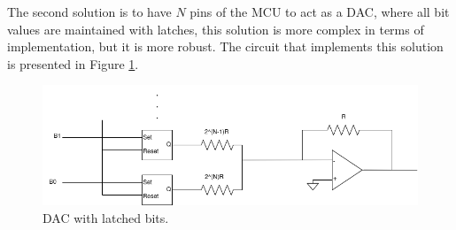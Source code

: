 The second solution is to have $N$ pins of the MCU to act as a DAC, where all bit values are maintained with latches, this solution is more complex in terms of implementation, but it is more robust. The circuit that implements this solution is presented in Figure \ref{fig:LatchDAC}.

\begin{figure}[H]
    \centering
    \includegraphics*[scale = 0.5]{Images/LatchCirc.png}
    \caption{DAC with latched bits.}
    \label{fig:LatchDAC}
\end{figure}
